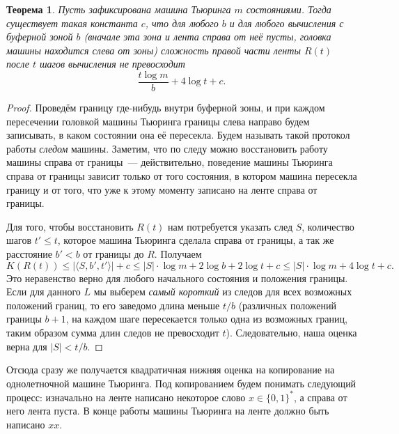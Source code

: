 \documentclass[12pt]{article}
\newcommand{\bits}{\{0,1\}}
\newcommand{\bitstr}{\bits^*}
\theoremstyle{definition}
\theoremstyle{plain}
\newtheorem{theorem}{Теорема}[section]
\theoremstyle{remark}
\begin{document}
\begin{theorem}
Пусть зафиксирована машина Тьюринга $m$ состояниями. Тогда существует такая константа $c$,
что для любого $b$ и для любого вычисления с буферной зоной $b$ (вначале эта зона и лента
справа от неё пусты, головка машины находится слева от зоны) сложность правой части ленты
$R(t)$ после $t$ шагов вычисления не превосходит
$$\frac{t\log m}{b} + 4\log t + c.$$
\end{theorem}
\begin{proof}
    Проведём границу где-нибудь внутри буферной зоны, и при каждом пересечении головкой
    машины Тьюринга границы слева направо будем записывать, в каком состоянии она её пересекла.
    Будем называть такой протокол работы \emph{следом} машины. Заметим, что по следу можно
    восстановить работу машины справа от границы~— действительно, поведение машины Тьюринга
    справа от границы зависит только от того состояния, в котором машина пересекла границу
    и от того, что уже к этому моменту записано на ленте справа от границы. 

    Для того, чтобы восстановить $R(t)$ нам потребуется указать след $S$, количество шагов $t'\le t$, 
    которое машина Тьюринга сделала справа от границы, а так же расстояние $b' < b$ от границы до $R$.
    Получаем 
    $$
    K(R(t)) \le |\langle S, b', t'\rangle| + c 
    \le |S|\cdot\log m + 2\log b + 2\log t + c 
    \le |S|\cdot\log m + 4\log t + c. 
    $$
    Это неравенство верно для любого начального состояния и положения границы. Если для
    данного $L$ мы выберем \emph{самый короткий} из следов для всех возможных положений границ, 
    то его заведомо длина меньше $t/b$ (различных положений границы $b + 1$, на каждом шаге 
    пересекается только одна из возможных границ, таким образом сумма длин следов не превосходит $t$).
    Следовательно, наша оценка верна для $|S| < t/b$.
\end{proof}

Отсюда сразу же получается квадратичная нижняя оценка на копирование на однолетночной
машине Тьюринга. Под копированием будем понимать следующий процесс: изначально на ленте 
написано некоторое слово $x\in\bitstr$, а справа от него лента пуста. В конце работы
машины Тьюринга на ленте должно быть написано $xx$.
\end{document}

